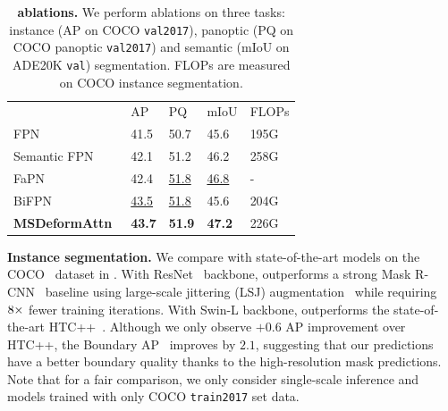 \begin{table}[t]
\begin{subtable}{0.32\linewidth}
  \centering
  \scriptsize
  \begin{tabular}{l | x{20}x{20}x{20} | x{24}}
   & AP & PQ & mIoU & FLOPs \\
  \shline
  FPN~\cite{lin2016feature} & 41.5 & 50.7 & 45.6 & 195G \\
  \hline
  Semantic FPN~\cite{kirillov2019panopticfpn} & 42.1 & 51.2 & 46.2 & 258G \\
  FaPN~\cite{fapn} & 42.4 & \underline{51.8} & \underline{46.8} & - \\
  BiFPN~\cite{tan2020efficientdet} & \underline{43.5} & \underline{51.8} & 45.6 & 204G \\
  \hline
  \textbf{MSDeformAttn}~\cite{zhu2021deformable} & \textbf{43.7} & \textbf{51.9} & \textbf{47.2} & 226G \\
  \end{tabular}
  \caption{\textbf{Pixel decoder.} MSDeformAttn~\cite{zhu2021deformable} consistently performs the best across all tasks.
  \phantom{pad} \phantom{pad} \phantom{pad} \phantom{pad} \phantom{pad} \phantom{pad} \phantom{pad} \phantom{pad} \phantom{pad} %
  }
  \label{tab:ablation:maskformer:c}
  \end{subtable}
  \caption{\textbf{\modelname ablations.} We perform ablations on three tasks: instance (AP on COCO \texttt{val2017}), panoptic (PQ on COCO panoptic \texttt{val2017}) and semantic (mIoU on ADE20K \texttt{val}) segmentation. FLOPs are measured on COCO instance segmentation.
  }
  \label{tab:ablation:maskformer}
  \vspace{-3mm}
\end{table}




\noindent\textbf{Instance segmentation.} We compare \modelname with state-of-the-art models %
on the COCO~\cite{lin2014coco} dataset in . With ResNet~\cite{he2016deep} backbone, \modelname outperforms a strong Mask R-CNN~\cite{he2017mask} baseline using large-scale jittering (LSJ) augmentation~\cite{ghiasi2021simple,du2021simple} while requiring $8\times$ fewer training iterations.
With Swin-L backbone, \modelname outperforms the state-of-the-art HTC++~\cite{chen2019hybrid}.
Although we only observe $+0.6$ AP improvement over HTC++, the Boundary AP~\cite{cheng2021boundary} improves by $2.1$, suggesting that our predictions have a better boundary quality %
thanks to the high-resolution mask predictions.
Note that for a fair comparison, we only consider single-scale inference and models trained with only COCO \texttt{train2017} set data.

